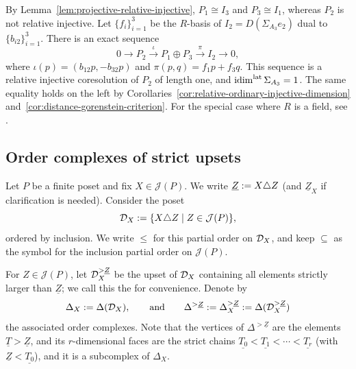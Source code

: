 \documentclass[a4paper,leqno]{amsart}
\begin{document}
\begin{eg}
\begin{enumerate}
By Lemma~\ref{lem:projective-relative-injective}, $P_1\cong I_3$ and $P_3\cong I_1$, whereas $P_2$ is not relative injective. Let $\{f_i\}_{i=1}^3$ be the $R$-basis of $I_2=D(\Sigma_{A_3}e_2)$ dual to $\{b_{i2}\}_{i=1}^3$. There is an exact sequence
\[
0\longrightarrow P_2
\xrightarrow{\ \iota\ }P_1\oplus P_3
\xrightarrow{\ \pi\ }I_2\longrightarrow0,
\]
where $\iota(p)=(b_{12}p,-b_{32}p)$ and $\pi(p,q)=f_1p+f_3q$. This sequence is a relative injective coresolution of $P_2$ of length one, and $\operatorname{idim}^{\operatorname{lat}}\Sigma_{A_3}=1$. The same equality holds on the left by Corollaries~\ref{cor:relative-ordinary-injective-dimension} and~\ref{cor:distance-gorenstein-criterion}.
For the special case where $R$ is a field, see \cite[Proposition~7.6]{CX26}.
\end{enumerate}
\end{eg}


\subsection{Order complexes of strict upsets}
\label{subsec:strict-upsets}

Let $P$ be a finite poset and fix $X\in\mathcal J(P)$.
We write $\underline{Z}:=X{\mathbin{\triangle}} Z$ (and $\underline{Z}_X$ if clarification is needed). Consider the poset
\[\mathcal D_X := \{X{\mathbin{\triangle}} Z \mid Z\in\mathcal J(P)\},\] 
ordered by inclusion.  We write $\le$ for this partial order on $\mathcal D_X$, and keep $\subseteq$ as the symbol for the inclusion partial order on $\mathcal{J}(P)$.

For $Z\in\mathcal J(P)$, let $\mathcal D_X^{>\underline{Z}}$ be the upset of $\mathcal D_X$ containing all elements strictly larger than $\underline{Z}$; we call this the  for convenience. Denote by
\[
\Delta_X:=\Delta(\mathcal D_X), \qquad \text{and} \qquad \Delta^{>\underline{Z}}:=\Delta_X^{>\underline{Z}}:=\Delta(\mathcal D_X^{>\underline{Z}})
\]
the associated order complexes.  Note that the vertices of $\Delta^{>\underline{Z}}$ are the elements $\underline{T}>\underline{Z}$, and its $r$-dimensional faces are the strict chains $\underline{T_0}<\underline{T_1}<\cdots<\underline{T_r}$ (with $\underline{Z}<\underline{T_0}$), and it is a subcomplex of $\Delta_X$.
\end{document}
